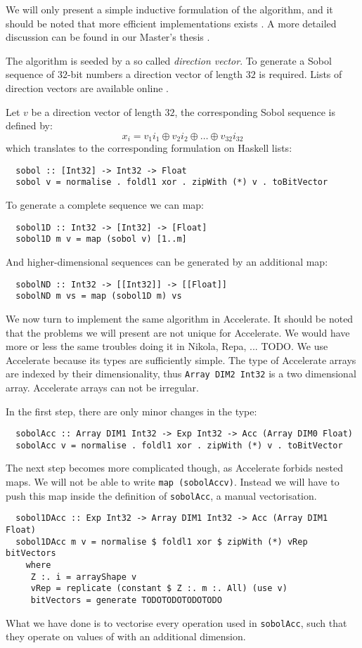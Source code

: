 \documentclass{llncs2e/llncs}
\begin{document}
We will only present a simple inductive formulation of the algorithm,
and it should be noted that more efficient implementations exists
\cite{bratley1988algorithm, hwy2011emerald}. A more detailed
discussion can be found in our Master's thesis
\cite{dybdalcarlsen2013thesis}.

The algorithm is seeded by a so called \emph{direction vector}. To
generate a Sobol sequence of $32$-bit numbers a direction vector of
length $32$ is required.  Lists of direction vectors are available
online \cite{homepage:sobol:directionvectors}. 

Let $v$ be a direction vector of length $32$, the corresponding
Sobol sequence is defined by:
$$x_i = v_1i_1 \oplus v_2i_2 \oplus \ldots \oplus v_{32}i_{32}$$
which translates to the corresponding formulation on Haskell lists:
\begin{verbatim}
  sobol :: [Int32] -> Int32 -> Float
  sobol v = normalise . foldl1 xor . zipWith (*) v . toBitVector
\end{verbatim}
To generate a complete sequence we can map:
\begin{verbatim}
  sobol1D :: Int32 -> [Int32] -> [Float]
  sobol1D m v = map (sobol v) [1..m]
\end{verbatim}
And higher-dimensional sequences can be generated by an additional map:
\begin{verbatim}
  sobolND :: Int32 -> [[Int32]] -> [[Float]]
  sobolND m vs = map (sobol1D m) vs
\end{verbatim}

We now turn to implement the same algorithm in Accelerate. It should
be noted that the problems we will present are not unique for
Accelerate. We would have more or less the same troubles doing it in
Nikola, Repa, ...  TODO. We use Accelerate because its types are
sufficiently simple. The type of Accelerate arrays are indexed by
their dimensionality, thus \verb|Array DIM2 Int32| is a two
dimensional array. Accelerate arrays can not be irregular.

In the first step, there are only minor changes in the type:
\begin{verbatim}
  sobolAcc :: Array DIM1 Int32 -> Exp Int32 -> Acc (Array DIM0 Float)
  sobolAcc v = normalise . foldl1 xor . zipWith (*) v . toBitVector
\end{verbatim}
The next step becomes more complicated though, as Accelerate forbids
nested maps. We will not be able to write \verb|map (sobolAccv)|. 
Instead we will have to push this map inside the definition of
\verb|sobolAcc|, a manual vectorisation.
\begin{verbatim}
  sobol1DAcc :: Exp Int32 -> Array DIM1 Int32 -> Acc (Array DIM1 Float)
  sobol1DAcc m v = normalise $ foldl1 xor $ zipWith (*) vRep bitVectors
    where
     Z :. i = arrayShape v
     vRep = replicate (constant $ Z :. m :. All) (use v)
     bitVectors = generate TODOTODOTODOTODO
\end{verbatim}
What we have done is to vectorise every operation used in
\verb|sobolAcc|, such that they operate on values of with an
additional dimension. 
\end{document}
